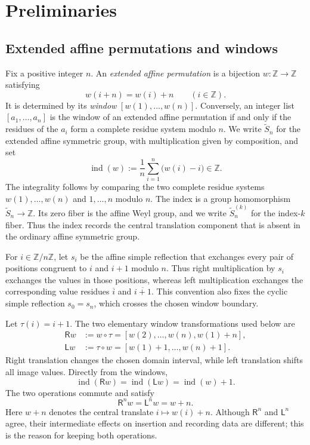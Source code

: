 \documentclass[11pt]{article}
\theoremstyle{definition}
\theoremstyle{remark}
\newcommand{\Z}{\mathbb Z}
\newcommand{\Sn}{\widetilde S_n}
\newcommand{\ol}[1]{\overline{#1}}
\newcommand{\ind}{\operatorname{ind}}
\newcommand{\Rop}{\mathsf R}
\newcommand{\Lop}{\mathsf L}
\begin{document}
\section{Preliminaries}\label{sec:prelim}

\subsection{Extended affine permutations and windows}

Fix a positive integer \(n\).  An \emph{extended affine permutation} is a bijection
\(w:\Z\to\Z\) satisfying
\[
                         w(i+n)=w(i)+n
                         \qquad(i\in\Z).
\]
It is determined by its \emph{window} \([w(1),\ldots,w(n)]\).  Conversely, an
integer list \([a_1,\ldots,a_n]\) is the window of an extended affine permutation
if and only if the residues of the \(a_i\) form a complete residue system modulo
\(n\).  We write \(\Sn\) for the extended affine symmetric group, with multiplication
given by composition, and set
\begin{equation}\label{eq:index}
        \ind(w):=\frac1n\sum_{i=1}^n\bigl(w(i)-i\bigr)\in\Z.
\end{equation}
The integrality follows by comparing the two complete residue systems
\(w(1),\ldots,w(n)\) and \(1,\ldots,n\) modulo \(n\).  The index is a group
homomorphism \(\Sn\to\Z\).  Its zero fiber is the affine Weyl group, and we write
\(\Sn^{(k)}\) for the index-\(k\) fiber.  Thus the index records the central
translation component that is absent in the ordinary affine symmetric group.

For \(i\in\Z/n\Z\), let \(s_i\) be the affine simple reflection that exchanges every
pair of positions congruent to \(i\) and \(i+1\) modulo \(n\).  Thus right
multiplication by \(s_i\) exchanges the values in those positions, whereas left
multiplication exchanges the corresponding value residues \(\ol i\) and \(\ol{i+1}\).
This convention also
fixes the cyclic simple reflection \(s_0=s_n\), which crosses the chosen window boundary.

Let \(\tau(i)=i+1\).  The two elementary window transformations used below are
\begin{align}
 \Rop w&:=w\circ\tau
      =[w(2),\ldots,w(n),w(1)+n],
 \label{eq:R-def}\\
 \Lop w&:=\tau\circ w
      =[w(1)+1,\ldots,w(n)+1].
 \label{eq:L-def}
\end{align}
Right translation changes the chosen domain interval, while left translation shifts
all image values.  Directly from the windows,
\begin{equation}\label{eq:index-shifts-prelim}
             \ind(\Rop w)=\ind(\Lop w)=\ind(w)+1.
\end{equation}
The two operations commute and satisfy
\begin{equation}\label{eq:central-window}
                         \Rop^n w=\Lop^n w=w+n.
\end{equation}
Here \(w+n\) denotes the central translate \(i\mapsto w(i)+n\).  Although
\(\Rop^n\) and \(\Lop^n\) agree, their intermediate effects on insertion and
recording data are different; this is the reason for keeping both operations.
\end{document}
